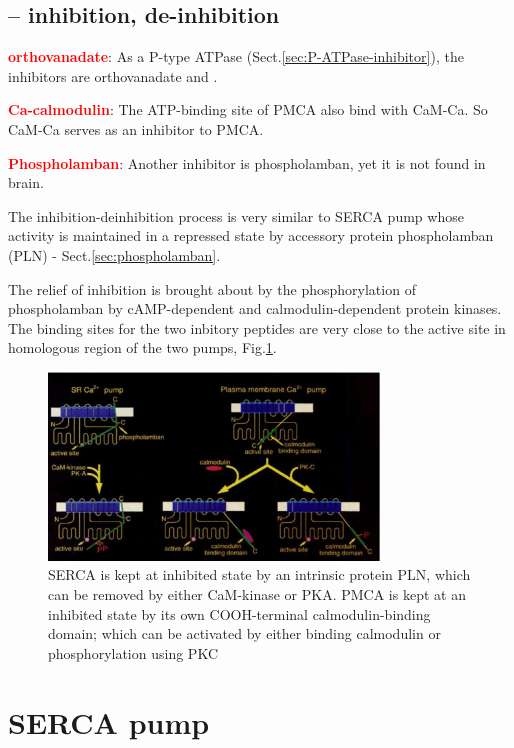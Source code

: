 \subsection{-- inhibition, de-inhibition}
\label{sec:PMCA-inhibitors}
\label{sec:PMCA-deinhibitors}

\textcolor{red}{\bf orthovanadate}:
As a P-type ATPase (Sect.\ref{sec:P-ATPase-inhibitor}), the inhibitors are
orthovanadate and . 

\textcolor{red}{\bf Ca-calmodulin}: The  ATP-binding site of PMCA also bind with
CaM-Ca. So CaM-Ca serves as an inhibitor to PMCA.


\textcolor{red}{\bf Phospholamban}: Another inhibitor is phospholamban, yet it
is not found in brain.


The inhibition-deinhibition process is very similar to SERCA pump whose activity
is maintained in a repressed state by accessory protein phospholamban (PLN) -
Sect.\ref{sec:phospholamban}.

The relief of inhibition is brought about by the phosphorylation of phospholamban by
cAMP-dependent and calmodulin-dependent protein kinases. The binding sites for
the two inbitory peptides are very close to the active site in homologous region
of the two pumps, Fig.\ref{fig:SERCA_PMCA}. 

\begin{figure}[hbt]
  \centerline{\includegraphics[height=5cm,
    angle=0]{./images/SERCA_PMCA.eps}}
\caption{SERCA is kept at inhibited state by an intrinsic protein PLN, which
can be removed by either CaM-kinase or PKA. PMCA is kept at an inhibited state
by its own COOH-terminal calmodulin-binding domain; which can be activated by
either binding calmodulin or phosphorylation using PKC}
\label{fig:SERCA_PMCA}
\end{figure}



\section{SERCA pump}
\label{sec:SERCA_pump}

